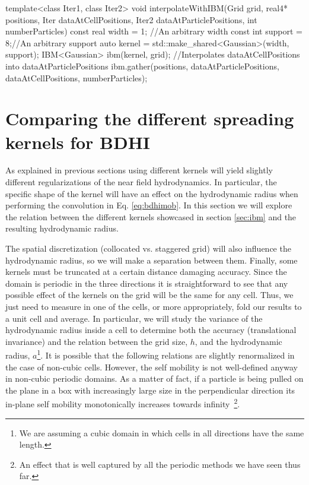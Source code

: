 \documentclass[ twoside,openright,titlepage,numbers=noenddot,%
headinclude,footinclude,cleardoublepage=empty,abstract=on,
BCOR=5mm,paper=b5,fontsize=11pt, dvipsnames
]{scrreprt}
\begin{document}
\begin{code2}
template<class Iter1, class Iter2>
void interpolateWithIBM(Grid grid, real4* positions,
                        Iter dataAtCellPositions,
                        Iter2 dataAtParticlePositions,
                        int numberParticles){
  const real width = 1; //An arbitrary width
  const int support = 8;//An arbitrary support
  auto kernel = std::make_shared<Gaussian>(width, support);
  IBM<Gaussian> ibm(kernel, grid);
  //Interpolates dataAtCellPositions into dataAtParticlePositions
  ibm.gather(positions, dataAtParticlePositions, dataAtCellPositions, numberParticles);
}

\end{code2}




\section{Comparing the different spreading kernels for BDHI}\label{sec:kernelcomp}
As explained in previous sections using different kernels will yield slightly different regularizations of the near field hydrodynamics. In particular, the specific shape of the kernel will have an effect on the hydrodynamic radius when performing the convolution in Eq. \eqref{eq:bdhimob}. In this section we will explore the relation between the different kernels showcased in section \ref{sec:ibm} and the resulting hydrodynamic radius. %

The spatial discretization (collocated vs. staggered grid) will also influence the hydrodynamic radius, so we will make a separation between them.
Finally, some kernels must be truncated at a certain distance damaging accuracy.
Since the domain is periodic in the three directions it is straightforward to see that any possible effect of the kernels on the grid will be the same for any cell. Thus, we just need to measure in one of the cells, or more appropriately, fold our results to a unit cell and average.
In particular, we will study the variance of the hydrodynamic radius inside a cell to determine both the accuracy (translational invariance) and the relation between the grid size, $h$, and the hydrodynamic radius, $a$\footnote{We are assuming a cubic domain in which cells in all directions have the same length.}. It is possible that the following relations are slightly renormalized in the case of non-cubic cells. However, the self mobility is not well-defined anyway in non-cubic periodic domains. As a matter of fact, if a particle is being pulled on the plane in a box with increasingly large size in the perpendicular direction its in-plane self mobility monotonically increases towards infinity~\cite{Vogele2016}\footnote{An effect that is well captured by all the periodic methods we have seen thus far.}.
\end{document}

